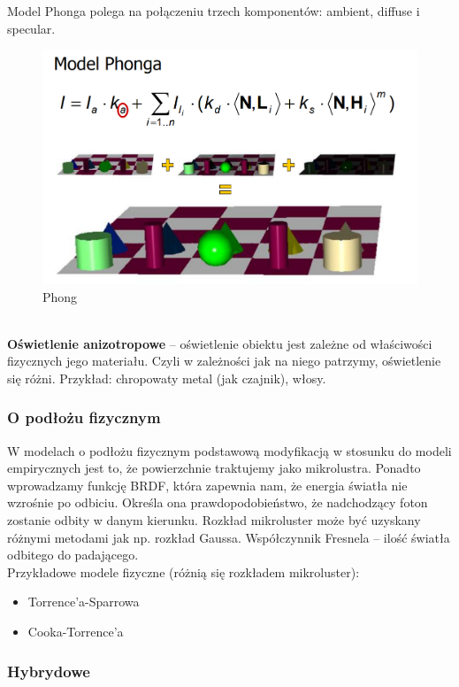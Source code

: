 \documentclass[12pt]{article}
\begin{document}
Model Phonga polega na połączeniu trzech komponentów: ambient, diffuse i specular.
\begin{figure}[H]
	\centering
	\includegraphics[scale=0.5]{Pictures/phong.png}
	\caption{Phong}
\end{figure}
~\\
\textbf{Oświetlenie anizotropowe} -- oświetlenie obiektu jest zależne od właściwości fizycznych jego materiału. Czyli w zależności jak na niego patrzymy, oświetlenie się różni. Przykład: chropowaty metal (jak czajnik), włosy. 

\subsubsection{O podłożu fizycznym}
W modelach o podłożu fizycznym podstawową modyfikacją w stosunku do modeli empirycznych jest to, że powierzchnie traktujemy jako mikrolustra. Ponadto wprowadzamy funkcję BRDF, która zapewnia nam, że energia światła nie wzrośnie po odbiciu. Określa ona prawdopodobieństwo, że nadchodzący foton zostanie odbity w danym kierunku. Rozkład mikroluster może być uzyskany różnymi metodami jak np. rozkład Gaussa. Współczynnik Fresnela -- ilość światła odbitego do padającego.\\
Przykładowe modele fizyczne (różnią się rozkładem mikroluster):
\begin{itemize}
	\item Torrence'a-Sparrowa
	\item Cooka-Torrence'a
\end{itemize}


\subsubsection{Hybrydowe}
\end{document}
